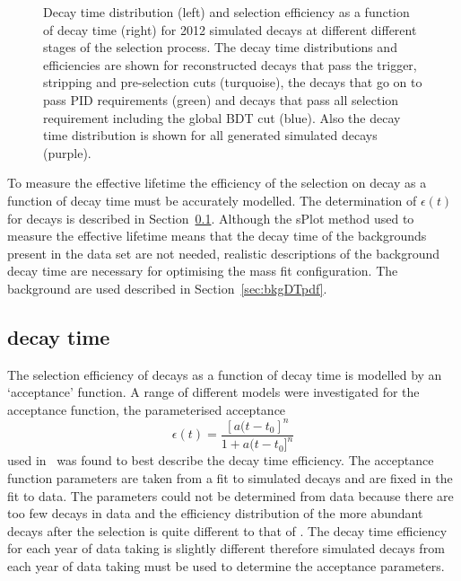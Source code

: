 \begin{figure}[htbp]
\begin{subfigure}[b]{0.48\textwidth}
   \end{subfigure}
    \caption{Decay time distribution (left) and selection efficiency as a function of decay time (right) for 2012 \bsmumu simulated decays at different different stages of the selection process. The decay time distributions and efficiencies are shown for reconstructed decays that pass the trigger, stripping and pre-selection cuts (turquoise), the decays that go on to pass PID requirements (green) and decays that pass all selection requirement including the global BDT cut (blue). Also the decay time distribution is shown for all generated simulated decays (purple).} %
    \label{fig:accpteg}
\end{figure}

To measure the \bsmumu effective lifetime the efficiency of the selection on \bsmumu decay as a function of decay time must be accurately modelled. The determination of $\epsilon(t)$ for \bsmumu decays is described in Section~\ref{sec:signalDTpdf}. Although the sPlot method used to measure the \bsmumu effective lifetime means that the decay time \pdfs of the backgrounds present in the data set are not needed, realistic  descriptions of the background decay time \pdfs are necessary for optimising the mass fit configuration. The background \pdfs are used described in Section~\ref{sec:bkgDTpdf}.


\subsection{\bsmumu decay time \pdf}
\label{sec:signalDTpdf}
The selection efficiency of \bsmumu decays as a function of decay time is modelled by an `acceptance' function. A range of different models were investigated for the acceptance function, the parameterised acceptance 
\begin{equation}
\epsilon(t) = \frac{[a(t - t_{0}]^{n}}{1 + a(t - t_{0}]^{n}}
\label{eq:accpt}
\end{equation}
used in~\cite{LHCb:2011ab} was found to best describe the \bsmumu decay time efficiency. The acceptance function parameters are taken from a fit to simulated \bsmumu decays and are fixed in the fit to data. The parameters could not be determined from data because there are too few \bsmumu decays in data and the efficiency distribution of the more abundant \bhh decays after the selection is quite different to that of \bsmumu. The decay time efficiency for each year of data taking is slightly different therefore simulated decays from each year of data taking must be used to determine the acceptance parameters.



